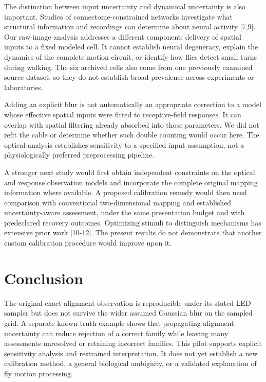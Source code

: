 \documentclass[11pt,letterpaper]{article}
\begin{document}
The distinction between input uncertainty and dynamical uncertainty is also important. Studies of connectome-constrained networks investigate what structural information and recordings can determine about neural activity [7,9]. Our raw-image analysis addresses a different component: delivery of spatial inputs to a fixed modeled cell. It cannot establish neural degeneracy, explain the dynamics of the complete motion circuit, or identify how flies detect small turns during walking. The six archived cells also come from one previously examined source dataset, so they do not establish broad prevalence across experiments or laboratories.


Adding an explicit blur is not automatically an appropriate correction to a model whose effective spatial inputs were fitted to receptive-field responses. It can overlap with spatial filtering already absorbed into those parameters. We did not refit the cable or determine whether such double counting would occur here. The optical analysis establishes sensitivity to a specified input assumption, not a physiologically preferred preprocessing pipeline.


A stronger next study would first obtain independent constraints on the optical and response observation models and incorporate the complete original mapping information where available. A proposed calibration remedy would then need comparison with conventional two-dimensional mapping and established uncertainty-aware assessment, under the same presentation budget and with predeclared recovery outcomes. Optimizing stimuli to distinguish mechanisms has extensive prior work [10-12]. The present results do not demonstrate that another custom calibration procedure would improve upon it.


\section{Conclusion}

The original exact-alignment observation is reproducible under its stated LED sampler but does not survive the wider assumed Gaussian blur on the sampled grid. A separate known-truth example shows that propagating alignment uncertainty can reduce rejection of a correct family while leaving many assessments unresolved or retaining incorrect families. This pilot supports explicit sensitivity analysis and restrained interpretation. It does not yet establish a new calibration method, a general biological ambiguity, or a validated explanation of fly motion processing.
\end{document}

